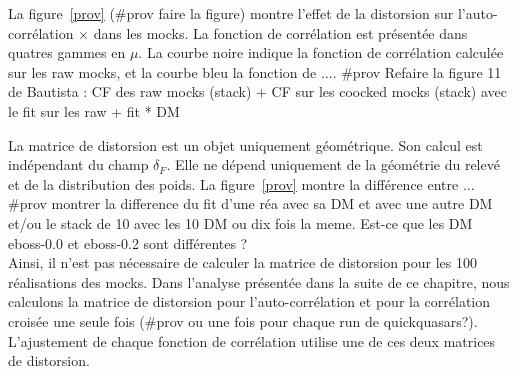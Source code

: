 \documentclass[11pt, twoside, a4paper, openright]{report}
\begin{document}
La figure~\ref{prov} (\#prov faire la figure) montre l'effet de la distorsion sur l'auto-corrélation \lya{}$\times$\lya{} dans les mocks. La fonction de corrélation est présentée dans quatres gammes en $\mu$. La courbe noire indique la fonction de corrélation calculée sur les raw mocks, et la courbe bleu la fonction de ....
\#prov Refaire la figure 11 de Bautista : CF des raw mocks (stack) + CF sur les coocked mocks (stack) avec le fit sur les raw + fit * DM


La matrice de distorsion est un objet uniquement géométrique. Son calcul est indépendant du champ $\delta_F$. Elle ne dépend uniquement de la géométrie du relevé et de la distribution des poids.
La figure~\ref{prov} montre la différence entre ... \#prov montrer la difference du fit d'une réa avec sa DM et avec une autre DM et/ou le stack de 10 avec les 10 DM ou dix fois la meme. Est-ce que les DM eboss-0.0 et eboss-0.2 sont différentes ?\\
Ainsi, il n'est pas nécessaire de calculer la matrice de distorsion pour les 100 réalisations des mocks.
Dans l'analyse présentée dans la suite de ce chapitre, nous calculons la matrice de distorsion pour l'auto-corrélation et pour la corrélation croisée une seule fois (\#prov ou une fois pour chaque run de quickquasars?). L'ajustement de chaque fonction de corrélation utilise une de ces deux matrices de distorsion.
\end{document}
